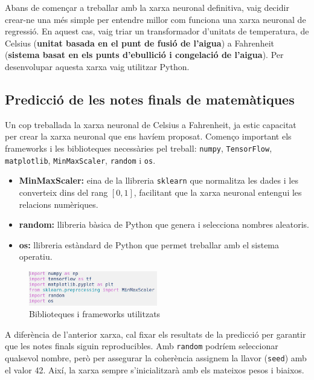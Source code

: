 Abans de començar a treballar amb la xarxa neuronal definitiva, vaig decidir crear-ne una més simple per entendre millor com funciona una xarxa neuronal de regressió. En aquest cas, vaig triar un transformador d’unitats de temperatura, de Celsius (\textbf{unitat basada en el punt de fusió de l’aigua}) a Fahrenheit (\textbf{sistema basat en els punts d’ebullició i congelació de l’aigua}). Per desenvolupar aquesta xarxa vaig utilitzar Python.


\subsection{Predicció de les notes finals de matemàtiques}

Un cop treballada la xarxa neuronal de Celsius a Fahrenheit, ja estic capacitat per crear la xarxa neuronal que ens havíem proposat.
Començo important els frameworks i les biblioteques necessàries pel treball: \texttt{numpy}, \texttt{TensorFlow}, \texttt{matplotlib}, \texttt{MinMaxScaler}, \texttt{random} i \texttt{os}.

\begin{itemize}
\item \textbf{MinMaxScaler:} eina de la llibreria \texttt{sklearn} que normalitza les dades i les converteix dins del rang $[0,1]$, facilitant que la xarxa neuronal entengui les relacions numèriques.
\item \textbf{random:} llibreria bàsica de Python que genera i selecciona nombres aleatoris.
\item \textbf{os:} llibreria estàndard de Python que permet treballar amb el sistema operatiu.
\end{itemize}

\begin{figure}[H]
\centering
\includegraphics[width=0.5\textwidth]{./figures/21.png}
\caption{Biblioteques i frameworks utilitzats}
\end{figure}

A diferència de l’anterior xarxa, cal fixar els resultats de la predicció per garantir que les notes finals siguin reproducibles. Amb \texttt{random} podríem seleccionar qualsevol nombre, però per assegurar la coherència assignem la llavor (\texttt{seed}) amb el valor 42. Així, la xarxa sempre s’inicialitzarà amb els mateixos pesos i biaixos.

